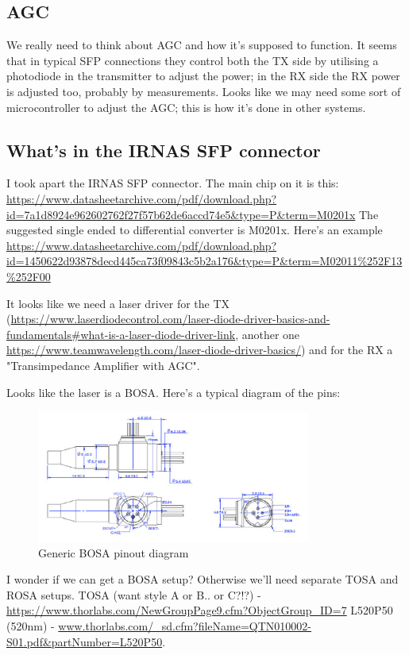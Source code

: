 \subsection{\ac{AGC}}
We really need to think about \ac{AGC} and how it's supposed to function. It
seems that in typical \ac{SFP} connections they control both the TX side
by utilising a photodiode in the transmitter to adjust the power; in the RX
side the RX power is adjusted too, probably by measurements.
Looks like we may need some sort of microcontroller to adjust the \ac{AGC}; this
is how it's done in other systems.

\subsection{What's in the IRNAS SFP connector}
I took apart the IRNAS SFP connector. The main chip on it is this:
\url{https://www.datasheetarchive.com/pdf/download.php?id=7a1d8924e962602762f27f57b62de6accd74e5&type=P&term=M0201x}
The suggested single ended to differential converter is M0201x. Here's an
example
\url{https://www.datasheetarchive.com/pdf/download.php?id=1450622d93878decd445ca73f09843c5b2a176&type=P&term=M02011%252F13%252F00}

It looks like we need a laser driver for the TX (\url{https://www.laserdiodecontrol.com/laser-diode-driver-basics-and-fundamentals#what-is-a-laser-diode-driver-link},
another one \url{https://www.teamwavelength.com/laser-diode-driver-basics/})
and for the RX a "Transimpedance Amplifier with AGC".

Looks like the laser is a \ac{BOSA}. Here's a typical diagram of the pins:

\begin{figure}[H]
  \includegraphics[width=0.8\textwidth]{bosa.png}
  \caption{Generic \ac{BOSA} pinout diagram}
  \label{fig:bosa}
\end{figure}

I wonder if we can get a \ac{BOSA} setup? Otherwise we'll need separate TOSA
and ROSA setups.
TOSA (want style A or B.. or C?!?) - \url{https://www.thorlabs.com/NewGroupPage9.cfm?ObjectGroup_ID=7}
L520P50 (520nm) - \url{www.thorlabs.com/_sd.cfm?fileName=QTN010002-S01.pdf&partNumber=L520P50}.

